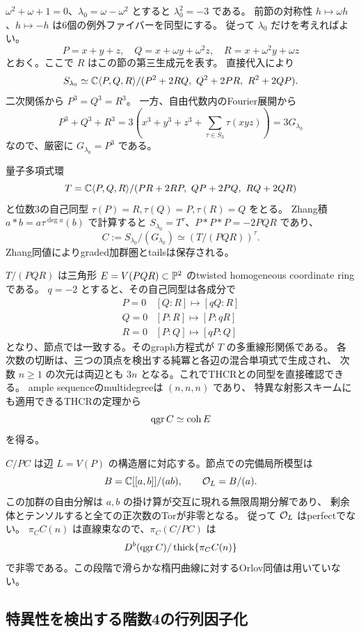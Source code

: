 $\omega^2+\omega+1=0$、$\lambda_0=\omega-\omega^2$ とすると $\lambda_0^2=-3$ である。
前節の対称性 $h\mapsto\omega h$、$h\mapsto-h$ は6個の例外ファイバーを同型にする。
従って $\lambda_0$ だけを考えればよい。
\[
 P=x+y+z,\quad Q=x+\omega y+\omega^2z,\quad R=x+\omega^2y+\omega z
\]
とおく。ここで $R$ はこの節の第三生成元を表す。
直接代入により
\[
 S_{\lambda_0}\simeq
 \mathbb C\langle P,Q,R\rangle/(P^2+2RQ,\ Q^2+2PR,\ R^2+2QP).
\]
二次関係から $P^3=Q^3=R^3$。
一方、自由代数内のFourier展開から
\[
 P^3+Q^3+R^3
 =3\left(x^3+y^3+z^3+\sum_{\tau\in S_3}\tau(xyz)\right)
 =3G_{\lambda_0}
\]
なので、厳密に $G_{\lambda_0}=P^3$ である。

量子多項式環
\[
 T=\mathbb C\langle P,Q,R\rangle/(PR+2RP,\ QP+2PQ,\ RQ+2QR)
\]
と位数3の自己同型 $\tau(P)=R,\tau(Q)=P,\tau(R)=Q$ をとる。
Zhang積 $a*b=a\tau^{\deg a}(b)$ で計算すると
$S_{\lambda_0}=T^\tau$、$P*P*P=-2PQR$ であり、
\[
 C:=S_{\lambda_0}/(G_{\lambda_0})\simeq(T/(PQR))^\tau.
\]
Zhang同値\cite[Theorem 1.1]{Zhang}によりgraded加群圏とtailsは保存される。

$T/(PQR)$ は三角形 $E=V(PQR)\subset\mathbb P^2$ のtwisted homogeneous coordinate ringである。
$q=-2$ とすると、その自己同型は各成分で
\[
 \begin{array}{c|c}
 P=0 &[Q:R]\mapsto[qQ:R]\\
 Q=0 &[P:R]\mapsto[P:qR]\\
 R=0 &[P:Q]\mapsto[qP:Q]
 \end{array}
\]
となり、節点では一致する。そのgraph方程式が $T$ の多重線形関係である。
各次数の切断は、三つの頂点を検出する純冪と各辺の混合単項式で生成され、
次数 $n\ge1$ の次元は両辺とも $3n$ となる。これでTHCRとの同型を直接確認できる。
ample sequenceのmultidegreeは $(n,n,n)$ であり、
特異な射影スキームにも適用できるTHCRの定理\cite{AV,SVdB}から
\[
 \operatorname{qgr} C\simeq\operatorname{coh}E
\]
を得る。

$C/PC$ は辺 $L=V(P)$ の構造層に対応する。節点での完備局所模型は
\[
 B=\mathbb C[[a,b]]/(ab),\qquad \mathcal O_L=B/(a).
\]
この加群の自由分解は $a,b$ の掛け算が交互に現れる無限周期分解であり、
剰余体とテンソルすると全ての正次数のTorが非零となる。
従って $\mathcal O_L$ はperfectでない。
$\pi_C C(n)$ は直線束なので、$\pi_C(C/PC)$ は
\[
 D^b(\operatorname{qgr} C)/\operatorname{thick}\{\pi_C C(n)\}
\]
で非零である。この段階で滑らかな楕円曲線に対するOrlov同値は用いていない。

\subsection{特異性を検出する階数4の行列因子化}

